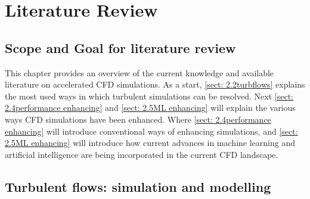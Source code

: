 \chapter{Literature Review}
\label{chap: 2}

\section{Scope and Goal for literature review}
\label{sect: 2.1scope}

This chapter provides an overview of the current knowledge and available literature on accelerated CFD simulations. As a start, \autoref{sect: 2.2turbflows} explains the most used ways in which turbulent simulations can be resolved. Next \autoref{sect: 2.4performance enhancing} and \autoref{sect: 2.5ML enhancing} will explain the various ways CFD simulations have been enhanced. Where \autoref{sect: 2.4performance enhancing} will introduce conventional ways of enhancing simulations, and \autoref{sect: 2.5ML enhancing} will introduce how current advances in machine learning and artificial intelligence are being incorporated in the current CFD landscape.  


\section{Turbulent flows: simulation and modelling}


